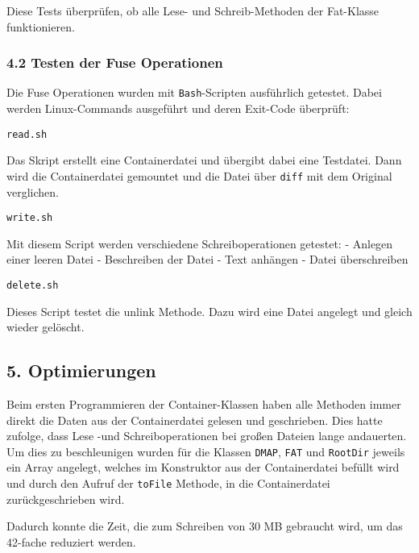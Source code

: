 \documentclass[]{article}
\newenvironment{Shaded}{}{}
\newcommand{\BuiltInTok}[1]{#1}
\newcommand{\KeywordTok}[1]{\textcolor[rgb]{0.00,0.44,0.13}{\textbf{#1}}}
\newcommand{\NormalTok}[1]{#1}
\newcommand{\OperatorTok}[1]{\textcolor[rgb]{0.40,0.40,0.40}{#1}}
\newcommand{\OtherTok}[1]{\textcolor[rgb]{0.00,0.44,0.13}{#1}}
\newcommand{\StringTok}[1]{\textcolor[rgb]{0.25,0.44,0.63}{#1}}
\newcommand{\VariableTok}[1]{\textcolor[rgb]{0.10,0.09,0.49}{#1}}
\begin{document}
Diese Tests überprüfen, ob alle Lese- und Schreib-Methoden der Fat-Klasse
funktionieren.

\hypertarget{testen-der-fuse-operationen}{%
\subsubsection{4.2 Testen der Fuse
Operationen}\label{testen-der-fuse-operationen}}

Die Fuse Operationen wurden mit \texttt{Bash}-Scripten ausführlich
getestet. Dabei werden Linux-Commands ausgeführt und deren Exit-Code überprüft:

\begin{Shaded}
\begin{framed}
\end{framed}
\end{Shaded}

\texttt{read.sh}

Das Skript erstellt eine Containerdatei und übergibt dabei eine
Testdatei. Dann wird die Containerdatei gemountet und die Datei über
\texttt{diff} mit dem Original verglichen.

\texttt{write.sh}

Mit diesem Script werden verschiedene Schreiboperationen getestet: -
Anlegen einer leeren Datei - Beschreiben der Datei - Text anhängen -
Datei überschreiben

\texttt{delete.sh}

Dieses Script testet die unlink Methode. Dazu wird eine Datei angelegt
und gleich wieder gelöscht.

\hypertarget{optimierungen}{%
\subsection{5. Optimierungen}\label{optimierungen}}

Beim ersten Programmieren der Container-Klassen haben alle Methoden
immer direkt die Daten aus der Containerdatei gelesen und geschrieben.
Dies hatte zufolge, dass Lese -und Schreiboperationen bei großen Dateien
lange andauerten. Um dies zu beschleunigen wurden für die Klassen
\texttt{DMAP}, \texttt{FAT} und \texttt{RootDir} jeweils ein Array
angelegt, welches im Konstruktor aus der Containerdatei befüllt wird und
durch den Aufruf der \texttt{toFile} Methode, in die Containerdatei
zurückgeschrieben wird.

Dadurch konnte die Zeit, die zum Schreiben von 30 MB gebraucht wird, um
das 42-fache reduziert werden.
\end{document}
